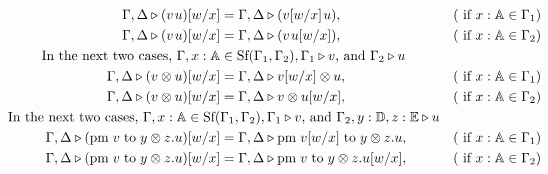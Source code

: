 \begin{definition}
\begin{align*}
  \hspace{-23pt}\Gamma, \Delta  \triangleright (v \hspace{1pt}  u)[w/x] &= \Gamma, \Delta  \triangleright (v[w/x] \hspace{1pt} u), & (\text{ if } x: \mathbb{A} \in \Gamma_1)\\
  \hspace{-23pt}\Gamma, \Delta  \triangleright (v \hspace{1pt}  u)[w/x] &= \Gamma, \Delta  \triangleright (v \hspace{1pt} u[w/x]), & (\text{ if } x: \mathbb{A} \in \Gamma_2)\\
  \hspace{-23pt}\text{In the next two cases, }\Gamma,x: \mathbb{A} & \in \text{Sf}(\Gamma_1,\Gamma_2), \Gamma_1 \triangleright v \text{, and } \Gamma_2 \triangleright u  \\
  \hspace{-23pt}\Gamma, \Delta  \triangleright (v \otimes u)[w/x] &= \Gamma, \Delta  \triangleright v[w/x] \otimes u, & (\text{ if } x: \mathbb{A} \in \Gamma_1)\\ 
  \hspace{-23pt}\Gamma, \Delta  \triangleright (v \otimes u)[w/x] &= \Gamma, \Delta  \triangleright v \otimes u[w/x], & (\text{ if } x: \mathbb{A} \in \Gamma_2)\\
  \hspace{-23pt}\text{In the next two cases, }\Gamma,x: \mathbb{A}  \in \text{Sf}(&\Gamma_1,\Gamma_2), \Gamma_1 \triangleright v \text{, and } \Gamma_2, y: \mathbb{D}, z:\mathbb{E} \triangleright u  \\
  \hspace{-23pt} \Gamma, \Delta  \triangleright (\text{pm} \hspace{3 pt} v \hspace{3 pt} \text{to} \hspace{3 pt} y \otimes z. u)[w/x] &= \Gamma, \Delta  \triangleright \text{pm} \hspace{3 pt} v[w/x] \hspace{3 pt} \text{to} \hspace{3 pt} y \otimes z. u,  &  (\text{ if } x: \mathbb{A} \in \Gamma_1) \\
  \hspace{-23pt} \Gamma, \Delta  \triangleright (\text{pm} \hspace{3 pt} v \hspace{3 pt} \text{to} \hspace{3 pt} y \otimes z. u)[w/x] &= \Gamma, \Delta  \triangleright \text{pm} \hspace{3 pt} v \hspace{3 pt} \text{to} \hspace{3 pt} y \otimes z. u[w/x],  &  (\text{ if } x: \mathbb{A} \in \Gamma_2) \\

\end{align*}
\end{definition}
